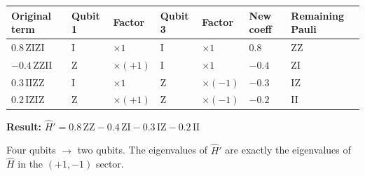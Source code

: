 \documentclass[
  11pt,
  oneside]{book}
\begin{document}
\begin{longtable}[]{@{}
  >{\centering\arraybackslash}p{}
  >{\centering\arraybackslash}p{}
  >{\centering\arraybackslash}p{}
  >{\centering\arraybackslash}p{}
  >{\centering\arraybackslash}p{}
  >{\centering\arraybackslash}p{}
  >{\centering\arraybackslash}p{}@{}}
\toprule\noalign{}
\begin{minipage}[b]{\linewidth}\centering
Original term
\end{minipage} & \begin{minipage}[b]{\linewidth}\centering
Qubit 1
\end{minipage} & \begin{minipage}[b]{\linewidth}\centering
Factor
\end{minipage} & \begin{minipage}[b]{\linewidth}\centering
Qubit 3
\end{minipage} & \begin{minipage}[b]{\linewidth}\centering
Factor
\end{minipage} & \begin{minipage}[b]{\linewidth}\centering
New coeff
\end{minipage} & \begin{minipage}[b]{\linewidth}\centering
Remaining Pauli
\end{minipage} \\
\midrule\noalign{}
\endhead
\bottomrule\noalign{}
\endlastfoot
\(0.8\,\text{ZIZI}\) & I & \(\times 1\) & I & \(\times 1\) & \(0.8\) &
ZZ \\
\(-0.4\,\text{ZZII}\) & Z & \(\times (+1)\) & I & \(\times 1\) &
\(-0.4\) & ZI \\
\(0.3\,\text{IIZZ}\) & I & \(\times 1\) & Z & \(\times (-1)\) & \(-0.3\)
& IZ \\
\(0.2\,\text{IZIZ}\) & Z & \(\times (+1)\) & Z & \(\times (-1)\) &
\(-0.2\) & II \\
\end{longtable}

\textbf{Result:}
\(\hat{H}' = 0.8\,\text{ZZ} - 0.4\,\text{ZI} - 0.3\,\text{IZ} - 0.2\,\text{II}\)

Four qubits $\rightarrow$ two qubits. The eigenvalues of \(\hat{H}'\) are exactly
the eigenvalues of \(\hat{H}\) in the \((+1, -1)\) sector.
\end{document}

